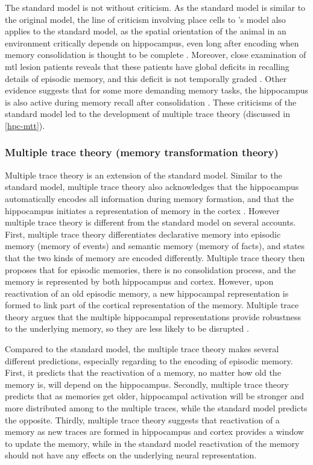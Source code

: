 The standard model is not without criticism. As the standard model is similar to the original \citet{marr71} model, the line of criticism involving place cells to \citet{marr71}'s model also applies to the standard model, as the spatial orientation of the animal in an environment critically depends on hippocampus, even long after encoding when memory consolidation is thought to be complete \citep[e.g.][]{mumby99, sutherland01, clark05}. Moreover, close examination of \gls{mtl} lesion patients reveals that these patients have global deficits in recalling details of episodic memory, and this deficit is not temporally graded \citep{cipolotti01, viskontas02}. Other evidence suggests that for some more demanding memory tasks, the hippocampus is also active during memory recall after consolidation \citep{ryan01, wheeler13}. These criticisms of the standard model led to the development of multiple trace theory (discussed in \ref{hpc-mtt}).

\subsubsection{Multiple trace theory (memory transformation theory) \label{hpc-mtt}}
Multiple trace theory is an extension of the standard model. Similar to the standard model,  multiple trace theory also acknowledges that the hippocampus automatically encodes all information during memory formation, and that the hippocampus initiates a representation of memory in the cortex \citep{nadel97}. However multiple trace theory is different from the standard model on several accounts. First, multiple trace theory differentiates declarative memory into episodic memory (memory of events) and semantic memory (memory of facts), and states that the two kinds of memory are encoded differently. Multiple trace theory then proposes that for episodic memories, there is no consolidation process, and the memory is represented by both hippocampus and cortex. However, upon reactivation of an old episodic memory, a new hippocampal representation is formed to link part of the cortical representation of the memory. Multiple trace theory argues that the multiple hippocampal representations provide robustness to the underlying memory, so they are less likely to be disrupted \citep{nadel97}. 

Compared to the standard model, the multiple trace theory makes several different predictions, especially regarding to the encoding of episodic memory. First, it predicts that the reactivation of a memory, no matter how old the memory is, will depend on the hippocampus. Secondly, multiple trace theory predicts that as memories get older, hippocampal activation will be stronger and more distributed among to the multiple traces, while the standard model predicts the opposite. Thirdly, multiple trace theory suggests that reactivation of a memory as new traces are formed in hippocampus and cortex provides a window to update the memory, while in the standard model reactivation of the memory should not have any effects on the underlying neural representation. 

